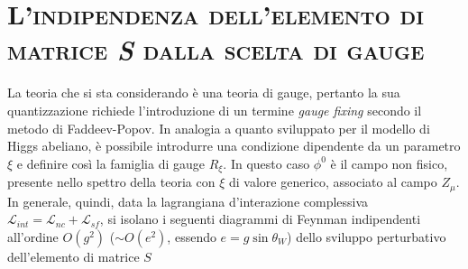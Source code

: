 \documentclass[11pt]{article}
\begin{document}
    \section{\centering\textsc{L'indipendenza dell'elemento di matrice \textit{S} dalla scelta di gauge} } %
    La teoria che si sta considerando è una teoria di gauge, pertanto la sua quantizzazione richiede l'introduzione di un termine \textit{gauge fixing} secondo il metodo di Faddeev-Popov. In analogia a quanto sviluppato per il modello di Higgs abeliano,
    è possibile introdurre una condizione dipendente da un parametro $\xi$ e definire così la famiglia di gauge $R_\xi$. In questo caso $\phi^0$ è il campo non fisico, presente nello spettro della teoria con $\xi$ di valore generico, associato al campo $Z_\mu$.
    In generale, quindi, data la lagrangiana d'interazione complessiva $\mathcal{L}_{int}=\mathcal{L}_{nc}+\mathcal{L}_{sf}$, si isolano i seguenti diagrammi di Feynman indipendenti all'ordine $O(g^2)$ ($\sim O(e^2)$, essendo $e=g\sin\theta_W$) dello sviluppo perturbativo
    dell'elemento di matrice $S$
\end{document}
